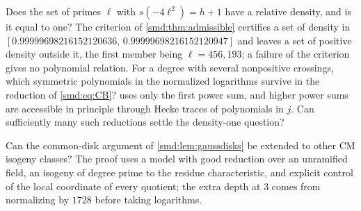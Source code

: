 \begin{question}\label{smd:q:density}
Does the set of primes $\ell$ with $s(-4\ell^2)=h+1$ have a relative density, and is it
equal to one? The criterion of \cref{smd:thm:admissible} certifies a set of density in
$[0.99999698216152120636,\,0.99999698216152120947]$ and leaves a set of positive density
outside it, the first member being $\ell=456{,}193$; a failure of the criterion gives no
polynomial relation. For a degree with several nonpositive crossings, which symmetric
polynomials in the normalized logarithms survive in the reduction of \eqref{smd:eq:CB}?
 uses only the first power sum, and higher power sums are accessible in
principle through Hecke traces of polynomials in $j$. Can sufficiently many such
reductions settle the density-one question?
\end{question}

\begin{question}\label{smd:q:isogeny}
Can the common-disk argument of \cref{smd:lem:gaussdisks} be extended to other CM isogeny
classes? The proof uses a model with good reduction over an unramified field, an isogeny
of degree prime to the residue characteristic, and explicit control of the local
coordinate of every quotient; the extra depth at $3$ comes from normalizing by $1728$
before taking logarithms.
\end{question}
